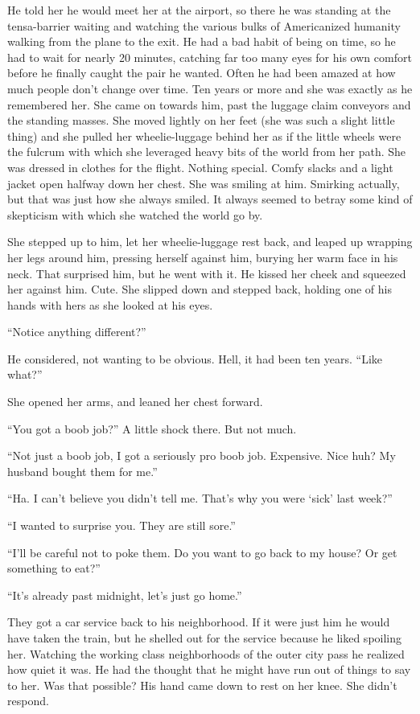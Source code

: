 \documentclass[letterpaper]{article}
\begin{document}
He told her he would meet her at the airport, so there he was standing at the tensa-barrier waiting and watching the various bulks of Americanized humanity walking from the plane to the exit.
He had a bad habit of being on time, so he had to wait for nearly 20 minutes, catching far too many eyes for his own comfort before he finally caught the pair he wanted.
Often he had been amazed at how much people don't change over time. Ten years or more and she was exactly as he remembered her.
She came on towards him, past the luggage claim conveyors and the standing masses. She moved lightly on her feet (she was such a slight little thing) and she pulled her wheelie-luggage behind her as if the little wheels were the fulcrum with which she leveraged heavy bits of the world from her path.
She was dressed in clothes for the flight. Nothing special. Comfy slacks and a light jacket open halfway down her chest. She was smiling at him. Smirking actually, but that was just how she always smiled. It always seemed to betray some kind of skepticism with which she watched the world go by.

She stepped up to him, let her wheelie-luggage rest back, and leaped up wrapping her legs around him, pressing herself against him, burying her warm face in his neck.
That surprised him, but he went with it. He kissed her cheek and squeezed her against him. Cute.
She slipped down and stepped back, holding one of his hands with hers as she looked at his eyes.

``Notice anything different?''

He considered, not wanting to be obvious. Hell, it had been ten years. ``Like what?''

She opened her arms, and leaned her chest forward.

``You got a boob job?'' A little shock there. But not much.

``Not just a boob job, I got a seriously pro boob job. Expensive. Nice huh? My husband bought them for me.''

``Ha. I can't believe you didn't tell me. That's why you were `sick' last week?''

``I wanted to surprise you. They are still sore.''

``I'll be careful not to poke them. Do you want to go back to my house? Or get something to eat?''

``It's already past midnight, let's just go home.''

They got a car service back to his neighborhood. If it were just him he would have taken the train, but he shelled out for the service because he liked spoiling her.
Watching the working class neighborhoods of the outer city pass he realized how quiet it was. He had the thought that he might have run out of things to say to her.
Was that possible?
His hand came down to rest on her knee. She didn't respond.
\end{document}
